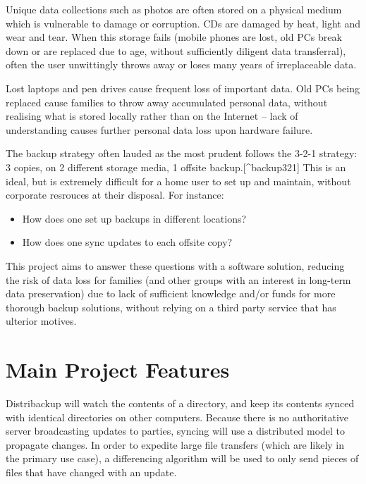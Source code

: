 \documentclass[12pt,a4paper,]{adreport}
\begin{document}
Unique data collections such as photos are often stored on a physical
medium which is vulnerable to damage or corruption. CDs are damaged by
heat, light and wear and tear. When this storage fails (mobile phones
are lost, old PCs break down or are replaced due to age, without
sufficiently diligent data transferral), often the user unwittingly
throws away or loses many years of irreplaceable data.

Lost laptops and pen drives cause frequent loss of important data. Old
PCs being replaced cause families to throw away accumulated personal
data, without realising what is stored locally rather than on the
Internet -- lack of understanding causes further personal data loss upon
hardware failure.

The backup strategy often lauded as the most prudent follows the 3-2-1
strategy: 3 copies, on 2 different storage media, 1 offsite
backup.{[}\^{}backup321{]} This is an ideal, but is extremely difficult
for a home user to set up and maintain, without corporate resrouces at
their disposal. For instance:

\begin{itemize}
\itemsep1pt\parskip0pt
\item
  How does one set up backups in different locations?
\item
  How does one sync updates to each offsite copy?
\end{itemize}

This project aims to answer these questions with a software solution,
reducing the risk of data loss for families (and other groups with an
interest in long-term data preservation) due to lack of sufficient
knowledge and/or funds for more thorough backup solutions, without
relying on a third party service that has ulterior motives.

\section{Main Project Features}\label{main-project-features}

Distribackup will watch the contents of a directory, and keep its
contents synced with identical directories on other computers. Because
there is no authoritative server broadcasting updates to parties,
syncing will use a distributed model to propagate changes. In order to
expedite large file transfers (which are likely in the primary use
case), a differencing algorithm will be used to only send pieces of
files that have changed with an update.
\end{document}
